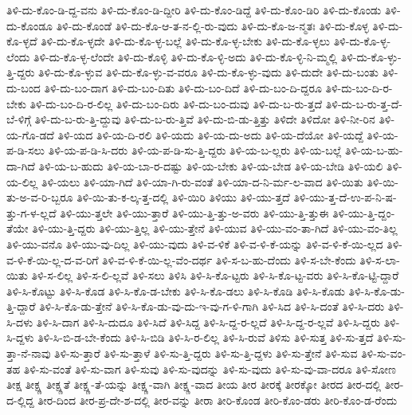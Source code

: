 {ತಿಳಿ-ದು-ಕೊಂ-ಡಿ-ದ್ದ-ವನು
ತಿಳಿ-ದು-ಕೊಂ-ಡಿ-ದ್ದೀರಿ
ತಿಳಿ-ದು-ಕೊಂ-ಡಿದ್ದೆ
ತಿಳಿ-ದು-ಕೊಂ-ಡಿರಿ
ತಿಳಿ-ದು-ಕೊಂಡು
ತಿಳಿ-ದು-ಕೊಂಡೂ
ತಿಳಿ-ದು-ಕೊಂಡೆ
ತಿಳಿ-ದು-ಕೊ-ಆ-ತ-ನ-ಲ್ಲಿ-ರು-ವುದು
ತಿಳಿ-ದು-ಕೊ-ಜ-ನ್ಮತಃ
ತಿಳಿ-ದು-ಕೊಳ್ಳ
ತಿಳಿ-ದು-ಕೊ-ಳ್ಳದೆ
ತಿಳಿ-ದು-ಕೊ-ಳ್ಳದೇ
ತಿಳಿ-ದು-ಕೊ-ಳ್ಳ-ಬಲ್ಲೆ
ತಿಳಿ-ದು-ಕೊ-ಳ್ಳ-ಬೇಕು
ತಿಳಿ-ದು-ಕೊ-ಳ್ಳಲು
ತಿಳಿ-ದು-ಕೊ-ಳ್ಳ-ಲೆಂದು
ತಿಳಿ-ದು-ಕೊ-ಳ್ಳ-ಲೆಂದೇ
ತಿಳಿ-ದು-ಕೊಳ್ಳಿ
ತಿಳಿ-ದು-ಕೊ-ಳ್ಳಿ-ಅದು
ತಿಳಿ-ದು-ಕೊ-ಳ್ಳಿ-ನಿ-ಮ್ಮಲ್ಲಿ
ತಿಳಿ-ದು-ಕೊ-ಳ್ಳು-ತ್ತಿ-ದ್ದರು
ತಿಳಿ-ದು-ಕೊ-ಳ್ಳುವ
ತಿಳಿ-ದು-ಕೊ-ಳ್ಳು-ವ-ವರೂ
ತಿಳಿ-ದು-ಕೊ-ಳ್ಳು-ವುದು
ತಿಳಿ-ದುದೇ
ತಿಳಿ-ದು-ಬಂತು
ತಿಳಿ-ದು-ಬಂದ
ತಿಳಿ-ದು-ಬಂ-ದಾಗ
ತಿಳಿ-ದು-ಬಂ-ದಿತು
ತಿಳಿ-ದು-ಬಂ-ದಿದೆ
ತಿಳಿ-ದು-ಬಂ-ದಿ-ದ್ದರೂ
ತಿಳಿ-ದು-ಬಂ-ದಿ-ರ-ಬೇಕು
ತಿಳಿ-ದು-ಬಂ-ದಿ-ರ-ಲಿಲ್ಲ
ತಿಳಿ-ದು-ಬಂ-ದಿರು
ತಿಳಿ-ದು-ಬಂ-ದುವು
ತಿಳಿ-ದು-ಬ-ರು-ತ್ತದೆ
ತಿಳಿ-ದು-ಬ-ರು-ತ್ತ-ದೆ-ಬೆ-ಳಿಗ್ಗೆ
ತಿಳಿ-ದು-ಬ-ರು-ತ್ತಿ-ದ್ದುವು
ತಿಳಿ-ದು-ಬ-ರು-ತ್ತಿವೆ
ತಿಳಿ-ದು-ಬಿ-ಡು-ತ್ತಿತ್ತು
ತಿಳಿದೇ
ತಿಳಿದೋ
ತಿಳಿ-ನೀ-ರಿನ
ತಿಳಿ-ಯ-ಗೊ-ಡದೆ
ತಿಳಿ-ಯದ
ತಿಳಿ-ಯ-ದಿ-ರಲಿ
ತಿಳಿ-ಯದು
ತಿಳಿ-ಯ-ದು-ಅದು
ತಿಳಿ-ಯ-ದೆಯೋ
ತಿಳಿ-ಯದ್ದೆ
ತಿಳಿ-ಯ-ಪ-ಡಿ-ಸಲು
ತಿಳಿ-ಯ-ಪ-ಡಿ-ಸಿ-ದರು
ತಿಳಿ-ಯ-ಪ-ಡಿ-ಸು-ತ್ತಿ-ದ್ದರು
ತಿಳಿ-ಯ-ಬ-ಲ್ಲರು
ತಿಳಿ-ಯ-ಬಲ್ಲೆ
ತಿಳಿ-ಯ-ಬ-ಹು-ದಾ-ಗಿದೆ
ತಿಳಿ-ಯ-ಬ-ಹುದು
ತಿಳಿ-ಯ-ಬಾ-ರ-ದಷ್ಟು
ತಿಳಿ-ಯ-ಬೇಕು
ತಿಳಿ-ಯ-ಬೇಡ
ತಿಳಿ-ಯ-ಬೇಡಿ
ತಿಳಿ-ಯಲಿ
ತಿಳಿ-ಯ-ಲಿಲ್ಲ
ತಿಳಿ-ಯಲು
ತಿಳಿ-ಯಾ-ಗಿದೆ
ತಿಳಿ-ಯಾ-ಗಿ-ರು-ವಂತೆ
ತಿಳಿ-ಯಾ-ದ-ನಿ-ರ್ಮ-ಲ-ವಾದ
ತಿಳಿ-ಯಿತು
ತಿಳಿ-ಯಿ-ತು-ಅ-ವ-ರಿ-ಬ್ಬರೂ
ತಿಳಿ-ಯಿ-ತು-ಕ-ಲ್ಕ-ತ್ತ-ದಲ್ಲಿ
ತಿಳಿ-ಯಿರಿ
ತಿಳಿಯು
ತಿಳಿ-ಯು-ತ್ತದೆ
ತಿಳಿ-ಯು-ತ್ತ-ದೆ-ಉ-ಪ-ನಿ-ಷ-ತ್ತು-ಗ-ಳ-ಲ್ಲದೆ
ತಿಳಿ-ಯು-ತ್ತಲೇ
ತಿಳಿ-ಯು-ತ್ತಾರೆ
ತಿಳಿ-ಯು-ತ್ತಿ-ತ್ತು-ಅ-ವರು
ತಿಳಿ-ಯು-ತ್ತಿ-ತ್ತುಈ
ತಿಳಿ-ಯು-ತ್ತಿ-ದ್ದಂ-ತೆಯೇ
ತಿಳಿ-ಯು-ತ್ತಿ-ದ್ದರು
ತಿಳಿ-ಯು-ತ್ತಿಲ್ಲ
ತಿಳಿ-ಯು-ತ್ತೇನೆ
ತಿಳಿ-ಯುವ
ತಿಳಿ-ಯು-ವಂ-ತಾ-ಗಿದೆ
ತಿಳಿ-ಯು-ವಂ-ತಿಲ್ಲ
ತಿಳಿ-ಯು-ವನೊ
ತಿಳಿ-ಯು-ವು-ದಿಲ್ಲ
ತಿಳಿ-ಯು-ವುದು
ತಿಳಿ-ವ-ಳಿಕೆ
ತಿಳಿ-ವ-ಳಿ-ಕೆ-ಯನ್ನು
ತಿಳಿ-ವ-ಳಿ-ಕೆ-ಯಿ-ಲ್ಲದ
ತಿಳಿ-ವ-ಳಿ-ಕೆ-ಯಿ-ಲ್ಲ-ದ-ವ-ರಿಗೆ
ತಿಳಿ-ವ-ಳಿ-ಕೆ-ಯಿ-ಲ್ಲ-ವೆಂ-ದರ್ಥ
ತಿಳಿ-ಸ-ಬ-ಹು-ದೆಂದು
ತಿಳಿ-ಸ-ಬೇ-ಕೆಂದು
ತಿಳಿ-ಸ-ಲಾ-ಯಿತು
ತಿಳಿ-ಸ-ಲಿಲ್ಲ
ತಿಳಿ-ಸ-ಲಿ-ಲ್ಲವೆ
ತಿಳಿ-ಸಲು
ತಿಳಿಸಿ
ತಿಳಿ-ಸಿ-ಕೊ-ಟ್ಟರು
ತಿಳಿ-ಸಿ-ಕೊ-ಟ್ಟ-ವರು
ತಿಳಿ-ಸಿ-ಕೊ-ಟ್ಟಿ-ದ್ದಾರೆ
ತಿಳಿ-ಸಿ-ಕೊಟ್ಟು
ತಿಳಿ-ಸಿ-ಕೊಡ
ತಿಳಿ-ಸಿ-ಕೊ-ಡ-ಬೇಕು
ತಿಳಿ-ಸಿ-ಕೊ-ಡಲು
ತಿಳಿ-ಸಿ-ಕೊಡಿ
ತಿಳಿ-ಸಿ-ಕೊಡು
ತಿಳಿ-ಸಿ-ಕೊ-ಡು-ತ್ತಿ-ದ್ದಾರೆ
ತಿಳಿ-ಸಿ-ಕೊ-ಡು-ತ್ತೇನೆ
ತಿಳಿ-ಸಿ-ಕೊ-ಡು-ವು-ದು-ಇ-ವು-ಗ-ಳಿ-ಗಾಗಿ
ತಿಳಿ-ಸಿದ
ತಿಳಿ-ಸಿ-ದಂತೆ
ತಿಳಿ-ಸಿ-ದರು
ತಿಳಿ-ಸಿ-ದಳು
ತಿಳಿ-ಸಿ-ದಾಗ
ತಿಳಿ-ಸಿ-ದುದೂ
ತಿಳಿ-ಸಿದೆ
ತಿಳಿ-ಸಿದ್ದ
ತಿಳಿ-ಸಿ-ದ್ದ-ರ-ಲ್ಲದೆ
ತಿಳಿ-ಸಿ-ದ್ದ-ರ-ಲ್ಲವೆ
ತಿಳಿ-ಸಿ-ದ್ದರು
ತಿಳಿ-ಸಿ-ದ್ದಳು
ತಿಳಿ-ಸಿ-ಬಿ-ಡ-ಬೇ-ಕೆಂದು
ತಿಳಿ-ಸಿ-ಬಿಡಿ
ತಿಳಿ-ಸಿ-ರ-ಲಿಲ್ಲ
ತಿಳಿ-ಸಿ-ರುವೆ
ತಿಳಿಸು
ತಿಳಿ-ಸುತ್ತ
ತಿಳಿ-ಸು-ತ್ತದೆ
ತಿಳಿ-ಸು-ತ್ತಾ-ನೆ-ನಾವು
ತಿಳಿ-ಸು-ತ್ತಾರೆ
ತಿಳಿ-ಸು-ತ್ತಾಳೆ
ತಿಳಿ-ಸು-ತ್ತಿ-ದ್ದರು
ತಿಳಿ-ಸು-ತ್ತಿ-ದ್ದಳು
ತಿಳಿ-ಸು-ತ್ತೇನೆ
ತಿಳಿ-ಸುವ
ತಿಳಿ-ಸು-ವಂ-ತಹ
ತಿಳಿ-ಸು-ವಂತೆ
ತಿಳಿ-ಸು-ವಾಗ
ತಿಳಿ-ಸುವು
ತಿಳಿ-ಸು-ವುದನ್ನು
ತಿಳಿ-ಸು-ವುದು
ತಿಳಿ-ಸು-ವು-ವಾ-ದರೂ
ತಿಳಿ-ಸೋಣ
ತೀಕ್ಷ
ತೀಕ್ಷ್ಣ
ತೀಕ್ಷ್ಣತೆ
ತೀಕ್ಷ್ಣ-ತೆ-ಯನ್ನು
ತೀಕ್ಷ್ಣ-ವಾಗಿ
ತೀಕ್ಷ್ಣ-ವಾದ
ತೀಯ
ತೀರ
ತೀರಕ್ಕೆ
ತೀರಕ್ಕೋ
ತೀರದ
ತೀರ-ದಲ್ಲಿ
ತೀರ-ದ-ಲ್ಲಿದ್ದ
ತೀರ-ದಿಂದ
ತೀರ-ಪ್ರ-ದೇ-ಶ-ದಲ್ಲಿ
ತೀರ-ವನ್ನು
ತೀರಾ
ತೀರಿ-ಕೊಂಡ
ತೀರಿ-ಕೊಂ-ಡರು
ತೀರಿ-ಕೊಂ-ಡ-ರೆಂದು
}
